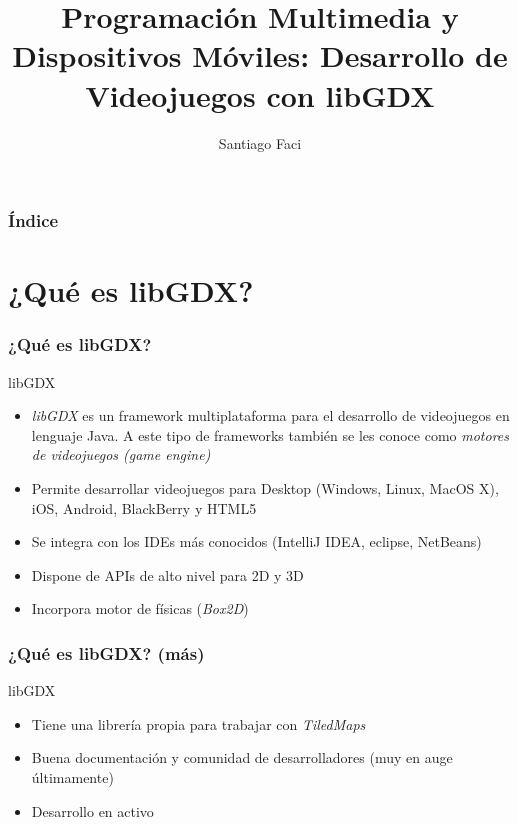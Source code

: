 \documentclass[xcolor={dvipsnames}]{beamer}
\begin{document}
\title{Programación Multimedia y Dispositivos Móviles: Desarrollo de Videojuegos con libGDX}
\author{Santiago Faci}
\institute{}
\date{} 

\begin{frame}
\titlepage
\end{frame}

\begin{frame}[plain]\frametitle{Índice}\tableofcontents
\end{frame} 


\section{¿Qué es libGDX?} 
\begin{frame}\frametitle{¿Qué es libGDX?} 
    \begin{block}{libGDX}
    \begin{itemize}
        \item \emph{\textcolor{resalta}{libGDX}} es un framework multiplataforma para el desarrollo de videojuegos en lenguaje Java. A este tipo de frameworks también se les conoce como \emph{motores de videojuegos (game engine)}
        \item Permite desarrollar videojuegos para Desktop (Windows, Linux, MacOS X), iOS, Android, BlackBerry y HTML5
        \item Se integra con los IDEs más conocidos (IntelliJ IDEA, eclipse, NetBeans)
        \item Dispone de APIs de alto nivel para 2D y 3D
        \item Incorpora motor de físicas (\emph{\textcolor{resalta}{Box2D}})
    \end{itemize}
    \end{block}
\end{frame}

\begin{frame}\frametitle{¿Qué es libGDX? (más)}
	\begin{block}{libGDX}
    \begin{itemize}
		\item Tiene una librería propia para trabajar con \emph{TiledMaps}
		\item Buena documentación y comunidad de desarrolladores (muy en auge últimamente)
		\item Desarrollo en activo \href{http://libgdx.badlogicgames.com}{}
    \end{itemize}
    \end{block}
\end{frame}
\end{document}
